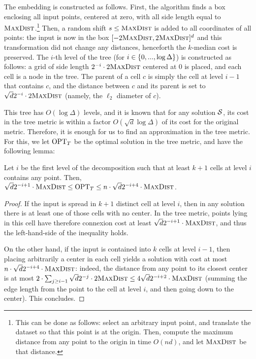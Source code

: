 The embedding is constructed as follows. First, the algorithm finds a box enclosing all input points, centered at zero, with all side length equal to $\textsc{MaxDist}$.\footnote{This can be done as follows: select an arbitrary input point, and translate the dataset so that this point is at the origin. Then, compute the maximum distance from any point to the origin in time $O(nd)$, and let $\textsc{MaxDist}$ be that distance.} Then, a random shift $s \leq \textsc{MaxDist}$ is added to all coordinates of all points: the input is now in the box $[-2\textsc{MaxDist}, 2\textsc{MaxDist}]^d$ and this transformation did not change any distances, henceforth the $k$-median cost is preserved. 
The $i$-th level of the tree (for $i \in \left\{ 0, ..., \log \Delta \right\}$) is constructed as follows: a grid of side length $2^{-i} \cdot 2\textsc{MaxDist}$ centered at $0$ is placed, and each cell is a node in the tree.
 The parent of a cell $c$ is simply the cell at level $i-1$ that contains $c$, and the distance between $c$ and its parent is set to $\sqrt{d}2^{-i} \cdot 2\textsc{MaxDist}$ (namely, the $\ell_2$ diameter of $c$).
 
 This tree has $O(\log \Delta)$ levels, and it is known that for any solution $\mathcal S$, its cost in the tree metric is within a factor $O(\sqrt d \log \Delta)$ of its cost for the original metric. Therefore, it is enough for us to find an approximation in the tree metric. For this, we let $\text{OPT}_T$ be the optimal solution in the tree metric, and have the following lemma:
 
\begin{lemma}\label{lem:apxTree}
Let $i$ be the first level of the decomposition such that at least $k+1$ cells at level $i$ contains any point. Then, $\sqrt{d}2^{-i+1} \cdot \textsc{MaxDist} \leq \text{OPT}_T \leq n \cdot \sqrt{d}2^{-i+4} \cdot \textsc{MaxDist}$.
\end{lemma}
\begin{proof}
If the input is spread in $k+1$ distinct cell at level $i$, then in any solution there is at least one of those cells with no center. In the tree metric, points lying in this cell have therefore connexion cost at least $\sqrt{d}2^{-i+1} \cdot \textsc{MaxDist}$, and thus the left-hand-side of the inequality holds.

On the other hand, if the input is contained into $k$ cells at level $i-1$, then placing arbitrarily a center in each cell yields a solution with cost at most $n \cdot \sqrt{d}2^{-i+4} \cdot \textsc{MaxDist}$: indeed, the distance from any point to its closest center is at most $2 \cdot \sum_{j \geq i-1} \sqrt{d}2^{-j} \cdot 2\textsc{MaxDist} \leq 4 \sqrt{d}2^{-i+2} \cdot \textsc{MaxDist}$ (summing the edge length from the point to the cell at level $i$, and then going down to the center). This concludes.
\end{proof}

